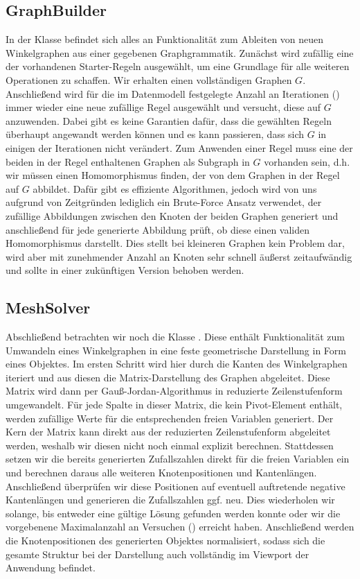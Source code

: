 \subsection{GraphBuilder}
In der  Klasse befindet sich alles an Funktionalität zum Ableiten von neuen Winkelgraphen aus einer gegebenen
Graphgrammatik. Zunächst wird zufällig eine der vorhandenen Starter-Regeln ausgewählt, um eine Grundlage für alle weiteren Operationen
zu schaffen. Wir erhalten einen vollständigen Graphen \(G\). Anschließend wird für die im Datenmodell festgelegte Anzahl an Iterationen
() immer wieder eine neue zufällige Regel ausgewählt und versucht, diese auf \(G\) anzuwenden. Dabei gibt es keine Garantien
dafür, dass die gewählten Regeln überhaupt angewandt werden können und es kann passieren, dass sich \(G\) in einigen der Iterationen
nicht verändert. Zum Anwenden einer Regel muss eine der beiden in der Regel enthaltenen Graphen als Subgraph in \(G\) vorhanden sein,
d.h. wir müssen einen Homomorphismus finden, der von dem Graphen in der Regel auf \(G\) abbildet. Dafür gibt es effiziente Algorithmen,
jedoch wird von uns aufgrund von Zeitgründen lediglich ein Brute-Force Ansatz verwendet, der zufällige Abbildungen zwischen den Knoten
der beiden Graphen generiert und anschließend für jede generierte Abbildung prüft, ob diese einen validen Homomorphismus darstellt.
Dies stellt bei kleineren Graphen kein Problem dar, wird aber mit zunehmender Anzahl an Knoten sehr schnell äußerst zeitaufwändig und
sollte in einer zukünftigen Version behoben werden.

\subsection{MeshSolver}
Abschließend betrachten wir noch die Klasse . Diese enthält Funktionalität zum Umwandeln eines Winkelgraphen in eine
feste geometrische Darstellung in Form eines  Objektes. Im ersten Schritt wird hier durch die Kanten des
Winkelgraphen iteriert und aus diesen die Matrix-Darstellung des Graphen abgeleitet. Diese Matrix wird dann per Gauß-Jordan-Algorithmus \cite{47_meyer}
in reduzierte Zeilenstufenform umgewandelt. Für jede Spalte in dieser Matrix, die kein Pivot-Element enthält, werden zufällige
Werte für die entsprechenden freien Variablen generiert. Der Kern der Matrix kann direkt aus der reduzierten Zeilenstufenform
abgeleitet werden, weshalb wir diesen nicht noch einmal explizit berechnen. Stattdessen setzen wir die bereits generierten Zufallszahlen
direkt für die freien Variablen ein und berechnen daraus alle weiteren Knotenpositionen und Kantenlängen. Anschließend überprüfen wir
diese Positionen auf eventuell auftretende negative Kantenlängen und generieren die Zufallszahlen ggf. neu. Dies wiederholen wir solange,
bis entweder eine gültige Lösung gefunden werden konnte oder wir die vorgebenene Maximalanzahl an Versuchen () erreicht haben.
Anschließend werden die Knotenpositionen des generierten  Objektes normalisiert, sodass sich die gesamte Struktur
bei der Darstellung auch vollständig im Viewport der Anwendung befindet.

